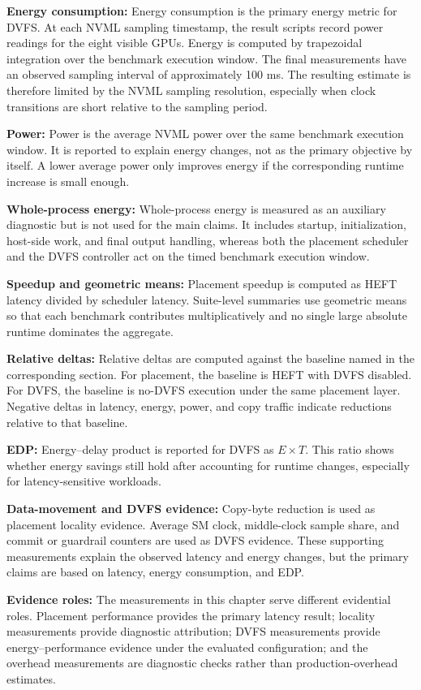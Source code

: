 \textbf{Energy consumption:}
Energy consumption is the primary energy metric for DVFS. At each NVML
sampling timestamp, the result scripts record power readings for the eight
visible GPUs. Energy is computed by trapezoidal integration over the
benchmark execution window. The final measurements have an observed sampling interval of
approximately 100 ms. The resulting estimate is therefore limited by the NVML
sampling resolution, especially when clock transitions are short relative to
the sampling period.

\textbf{Power:}
Power is the average NVML power over the same benchmark execution window. It
is reported to explain energy changes, not as the primary objective by itself.
A lower average power only improves energy if the corresponding runtime
increase is small enough.

\textbf{Whole-process energy:}
Whole-process energy is measured as an auxiliary diagnostic but is not used for
the main claims. It includes startup, initialization, host-side work, and final
output handling, whereas both the placement scheduler and the DVFS controller
act on the timed benchmark execution window.

\textbf{Speedup and geometric means:}
Placement speedup is computed as HEFT latency divided by scheduler latency.
Suite-level summaries use geometric means so that each benchmark contributes
multiplicatively and no single large absolute runtime dominates the aggregate.

\textbf{Relative deltas:}
Relative deltas are computed against the baseline named in the corresponding
section. For placement, the baseline is HEFT with DVFS disabled. For DVFS, the
baseline is no-DVFS execution under the same placement layer. Negative deltas
in latency, energy, power, and copy traffic indicate reductions relative to
that baseline.

\textbf{EDP:}
Energy--delay product is reported for DVFS as \(E \times T\). This ratio shows
whether energy savings still hold after accounting for runtime changes,
especially for latency-sensitive workloads.

\textbf{Data-movement and DVFS evidence:}
Copy-byte reduction is used as placement locality evidence. Average SM clock,
middle-clock sample share, and commit or guardrail counters are used as DVFS
evidence. These supporting measurements explain the observed latency and energy
changes, but the primary claims are based on latency, energy consumption, and
EDP.

\textbf{Evidence roles:}
The measurements in this chapter serve different evidential roles. Placement
performance provides the primary latency result; locality measurements provide
diagnostic attribution; DVFS measurements provide energy--performance evidence
under the evaluated configuration; and the overhead measurements are
diagnostic checks rather than production-overhead estimates.

